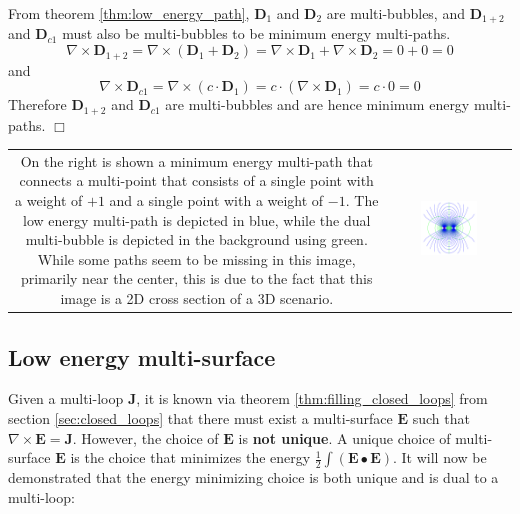 From theorem \ref{thm:low_energy_path}, \(\mathbf{D}_1\) and \(\mathbf{D}_2\) are multi-bubbles, and \(\mathbf{D}_{1+2}\) and \(\mathbf{D}_{c1}\) must also be multi-bubbles to be minimum energy multi-paths. 
\[\nabla \times \mathbf{D}_{1+2} = \nabla \times (\mathbf{D}_1 + \mathbf{D}_2) = \nabla \times \mathbf{D}_1 + \nabla \times \mathbf{D}_2 = 0 + 0 = 0\]
and 
\[\nabla \times \mathbf{D}_{c1} = \nabla \times (c \cdot \mathbf{D}_1) = c \cdot (\nabla \times \mathbf{D}_1) = c \cdot 0 = 0\]
Therefore \(\mathbf{D}_{1+2}\) and \(\mathbf{D}_{c1}\) are multi-bubbles and are hence minimum energy multi-paths. \(\Box\)

\begin{tabular}{cc}
\parbox{0.5\textwidth}{
On the right is shown a minimum energy multi-path that connects a multi-point that consists of a single point with a weight of \(+1\) and a single point with a weight of \(-1\). The low energy multi-path is depicted in blue, while the dual multi-bubble is depicted in the background using green. While some paths seem to be missing in this image, primarily near the center, this is due to the fact that this image is a 2D cross section of a 3D scenario.
} & \parbox{0.5\textwidth}{
\includegraphics[width = 0.5\textwidth]{Duality/primary_multi-path_with_simple_balanced_multi-point_3}
}
\end{tabular}




\subsection{Low energy multi-surface}

Given a multi-loop \(\mathbf{J}\), it is known via theorem \ref{thm:filling_closed_loops} from section \ref{sec:closed_loops} that there must exist a multi-surface \(\mathbf{E}\) such that \(\nabla \times \mathbf{E} = \mathbf{J}\). However, the choice of \(\mathbf{E}\) is {\bf not unique}. A unique choice of multi-surface \(\mathbf{E}\) is the choice that minimizes the energy \(\frac{1}{2}\int (\mathbf{E} \bullet \mathbf{E})\). It will now be demonstrated that the energy minimizing choice is both unique and is dual to a multi-loop:

